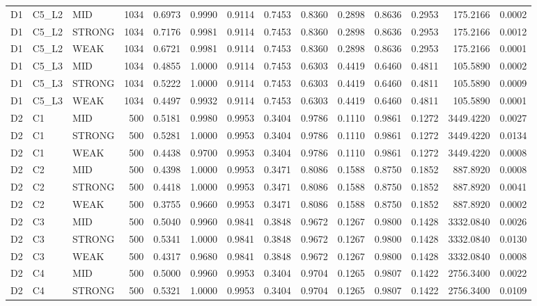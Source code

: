 \begin{tabular}{lllrrrrrrrrrrr}
D1 & C5\_L2 & MID & 1034 & 0.6973 & 0.9990 & 0.9114 & 0.7453 & 0.8360 & 0.2898 & 0.8636 & 0.2953 & 175.2166 & 0.0002 \\
D1 & C5\_L2 & STRONG & 1034 & 0.7176 & 0.9981 & 0.9114 & 0.7453 & 0.8360 & 0.2898 & 0.8636 & 0.2953 & 175.2166 & 0.0012 \\
D1 & C5\_L2 & WEAK & 1034 & 0.6721 & 0.9981 & 0.9114 & 0.7453 & 0.8360 & 0.2898 & 0.8636 & 0.2953 & 175.2166 & 0.0001 \\
D1 & C5\_L3 & MID & 1034 & 0.4855 & 1.0000 & 0.9114 & 0.7453 & 0.6303 & 0.4419 & 0.6460 & 0.4811 & 105.5890 & 0.0002 \\
D1 & C5\_L3 & STRONG & 1034 & 0.5222 & 1.0000 & 0.9114 & 0.7453 & 0.6303 & 0.4419 & 0.6460 & 0.4811 & 105.5890 & 0.0009 \\
D1 & C5\_L3 & WEAK & 1034 & 0.4497 & 0.9932 & 0.9114 & 0.7453 & 0.6303 & 0.4419 & 0.6460 & 0.4811 & 105.5890 & 0.0001 \\
D2 & C1 & MID & 500 & 0.5181 & 0.9980 & 0.9953 & 0.3404 & 0.9786 & 0.1110 & 0.9861 & 0.1272 & 3449.4220 & 0.0027 \\
D2 & C1 & STRONG & 500 & 0.5281 & 1.0000 & 0.9953 & 0.3404 & 0.9786 & 0.1110 & 0.9861 & 0.1272 & 3449.4220 & 0.0134 \\
D2 & C1 & WEAK & 500 & 0.4438 & 0.9700 & 0.9953 & 0.3404 & 0.9786 & 0.1110 & 0.9861 & 0.1272 & 3449.4220 & 0.0008 \\
D2 & C2 & MID & 500 & 0.4398 & 1.0000 & 0.9953 & 0.3471 & 0.8086 & 0.1588 & 0.8750 & 0.1852 & 887.8920 & 0.0008 \\
D2 & C2 & STRONG & 500 & 0.4418 & 1.0000 & 0.9953 & 0.3471 & 0.8086 & 0.1588 & 0.8750 & 0.1852 & 887.8920 & 0.0041 \\
D2 & C2 & WEAK & 500 & 0.3755 & 0.9660 & 0.9953 & 0.3471 & 0.8086 & 0.1588 & 0.8750 & 0.1852 & 887.8920 & 0.0002 \\
D2 & C3 & MID & 500 & 0.5040 & 0.9960 & 0.9841 & 0.3848 & 0.9672 & 0.1267 & 0.9800 & 0.1428 & 3332.0840 & 0.0026 \\
D2 & C3 & STRONG & 500 & 0.5341 & 1.0000 & 0.9841 & 0.3848 & 0.9672 & 0.1267 & 0.9800 & 0.1428 & 3332.0840 & 0.0130 \\
D2 & C3 & WEAK & 500 & 0.4317 & 0.9680 & 0.9841 & 0.3848 & 0.9672 & 0.1267 & 0.9800 & 0.1428 & 3332.0840 & 0.0008 \\
D2 & C4 & MID & 500 & 0.5000 & 0.9960 & 0.9953 & 0.3404 & 0.9704 & 0.1265 & 0.9807 & 0.1422 & 2756.3400 & 0.0022 \\
D2 & C4 & STRONG & 500 & 0.5321 & 1.0000 & 0.9953 & 0.3404 & 0.9704 & 0.1265 & 0.9807 & 0.1422 & 2756.3400 & 0.0109 \\

\end{tabular}
